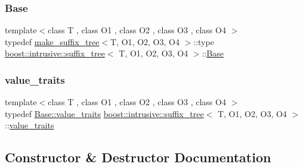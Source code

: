 \subsubsection{\texorpdfstring{Base}{Base}}
{\footnotesize\ttfamily template$<$class T , class O1 , class O2 , class O3 , class O4 $>$ \\
typedef \hyperlink{structboost_1_1intrusive_1_1make__suffix__tree}{make\+\_\+suffix\+\_\+tree}$<$T, O1, O2, O3, O4 $>$\+::type \hyperlink{classboost_1_1intrusive_1_1suffix__tree}{boost\+::intrusive\+::suffix\+\_\+tree}$<$ T, O1, O2, O3, O4 $>$\+::\hyperlink{classboost_1_1intrusive_1_1suffix__tree_a4e4d560ba016e68c15ecf4c4f88331e5}{Base}}

\mbox{\label{classboost_1_1intrusive_1_1suffix__tree_a20b10e59065c1615575e5f76038289fd}} 
\subsubsection{\texorpdfstring{value\+\_\+traits}{value\_traits}}
{\footnotesize\ttfamily template$<$class T , class O1 , class O2 , class O3 , class O4 $>$ \\
typedef \hyperlink{classboost_1_1intrusive_1_1suffix__tree__impl_a30d9e164c38c11cd38917ad14e9f3e88}{Base\+::value\+\_\+traits} \hyperlink{classboost_1_1intrusive_1_1suffix__tree}{boost\+::intrusive\+::suffix\+\_\+tree}$<$ T, O1, O2, O3, O4 $>$\+::\hyperlink{classboost_1_1intrusive_1_1suffix__tree__impl_a30d9e164c38c11cd38917ad14e9f3e88}{value\+\_\+traits}}



\subsection{Constructor \& Destructor Documentation}
\mbox{\label{classboost_1_1intrusive_1_1suffix__tree_a3a428cbd18b652d8bfea604a3edb0414}} 
